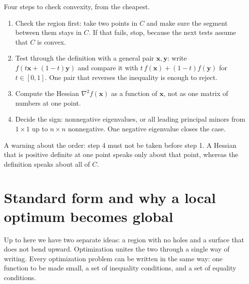 \begin{resep}
Four steps to check convexity, from the cheapest.
\begin{enumerate}
  \item Check the region first: take two points in $C$ and make sure the segment between them
        stays in $C$. If that fails, stop, because the next tests assume that $C$ is convex.
  \item Test through the definition with a general pair $\mathbf{x},\mathbf{y}$: write
        $f(t\mathbf{x}+(1-t)\mathbf{y})$ and compare it with
        $t\,f(\mathbf{x})+(1-t)f(\mathbf{y})$ for $t\in[0,1]$. One pair that reverses the
        inequality is enough to reject.
  \item Compute the Hessian $\nabla^{2}f(\mathbf{x})$ as a function of $\mathbf{x}$, not as
        one matrix of numbers at one point.
  \item Decide the sign: nonnegative eigenvalues, or all leading principal minors from
        $1\times1$ up to $n\times n$ nonnegative. One negative eigenvalue closes the case.
\end{enumerate}
A warning about the order: step 4 must not be taken before step 1. A Hessian that is positive
definite at one point speaks only about that point, whereas the definition speaks about all of
$C$.
\end{resep}

\section{Standard form and why a local optimum becomes global}

Up to here we have two separate ideas: a region with no holes and a surface that does not bend
upward. Optimization unites the two through a single way of writing. Every optimization
problem can be written in the same way: one function to be made small, a set of inequality
conditions, and a set of equality conditions.


